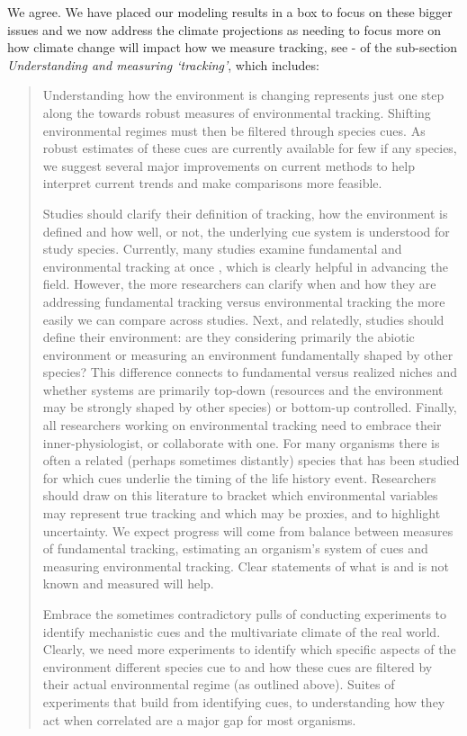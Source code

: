 \documentclass[11pt]{article}
\begin{document}
We agree. We have placed our modeling results in a box to focus on these bigger issues and we now address the climate projections as needing to focus more on how climate change will impact how we measure tracking, see - of the sub-section \emph{Understanding and measuring `tracking'}, which includes:
\begin{quote}
Understanding how the environment is changing represents just one step along the towards robust measures of environmental tracking. Shifting environmental regimes must then be filtered through species cues. As robust estimates of these cues are currently available for few if any species, we suggest several major improvements on current methods to help interpret current trends and make comparisons more feasible. 

Studies should clarify their definition of tracking, how the environment is defined and how well, or not, the underlying cue system is understood for study species. Currently, many studies examine fundamental and environmental tracking at once \citep[e.g.,][]{yang2020}, which is clearly helpful in advancing the field. However, the more researchers can clarify when and how they are addressing fundamental tracking versus environmental tracking the more easily we can compare across studies. Next, and relatedly, studies should define their environment: are they considering primarily the abiotic environment or measuring an environment fundamentally shaped by other species? This difference connects to fundamental versus realized niches and  whether systems are primarily top-down (resources and the environment may be strongly shaped by other species) or bottom-up controlled. Finally, all researchers working on environmental tracking need to embrace their inner-physiologist, or collaborate with one. For many organisms there is often a related (perhaps sometimes distantly) species that has been studied for which cues underlie the timing of the life history event. Researchers should draw on this literature to bracket which environmental variables may represent true tracking and which may be proxies, and to highlight uncertainty. We expect progress will come from balance between measures of fundamental tracking, estimating an organism's system of cues and measuring environmental tracking. Clear statements of what is and is not known and measured will help. 

Embrace the sometimes contradictory pulls of conducting experiments to identify mechanistic cues and the multivariate climate of the real world. Clearly, we need more experiments to identify which specific aspects of the environment different species cue to and how these cues are filtered by their actual environmental regime (as outlined above). Suites of experiments that build from identifying cues, to understanding how they act when correlated are a major gap for most organisms. 
\end{quote}
\end{document}
